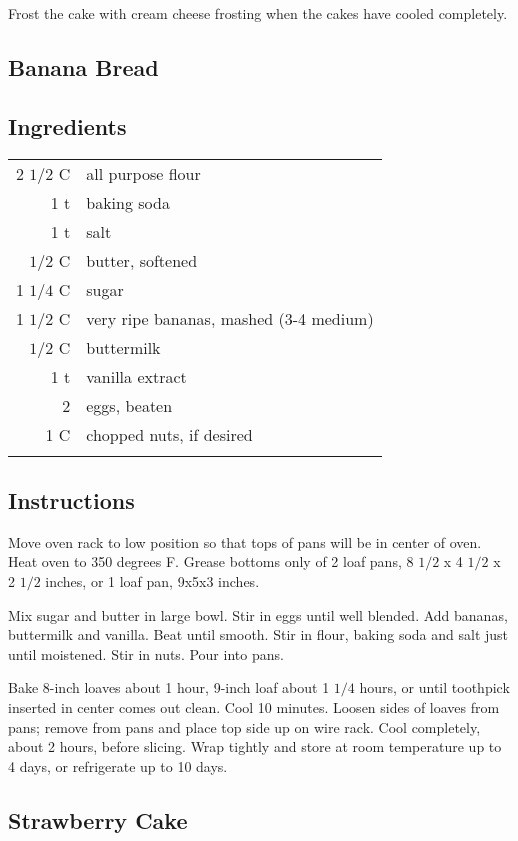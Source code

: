 \documentclass[12pt,landscape,twoside,twocolumn, openright, titlepage, draft]{book}
\begin{document}
Frost the cake with cream cheese frosting when the cakes have cooled
completely.

\subsection{Banana Bread}
\subsection{Ingredients}
\begin{tabular}{r p{1.5in}}
  2 $1/2$ C & all purpose flour \\
  1 t       & baking soda \\
  1 t       & salt \\
  $1/2$ C   & butter, softened  \\
  1 $1/4$ C & sugar \\
  1 $1/2$ C & very ripe bananas, mashed (3-4 medium) \\
  $1/2$ C   & buttermilk \\
  1 t       & vanilla extract \\
  2         & eggs, beaten \\
  1 C       & chopped nuts, if desired \\ \\
\end{tabular}

\subsection{Instructions}
Move oven rack to low position so that tops of pans will be in center of oven. Heat oven to 350 degrees F. Grease bottoms only of 2 loaf pans, 8 $1/2$ x 4 $1/2$ x 2 $1/2$ inches, or 1 loaf pan, 9x5x3 inches. 

Mix sugar and butter in large bowl. Stir in eggs until well blended. Add bananas, buttermilk and vanilla. Beat until smooth. Stir in flour, baking soda and salt just until moistened. Stir in nuts. Pour into pans. 

Bake 8-inch loaves about 1 hour, 9-inch loaf about 1 $1/4$ hours, or until toothpick inserted in center comes out clean. Cool 10 minutes. Loosen sides of loaves from pans; remove from pans and place top side up on wire rack. Cool completely, about 2 hours, before slicing. Wrap tightly and store at room temperature up to 4 days, or refrigerate up to 10 days. 

\subsection{Strawberry Cake}
\end{document}
